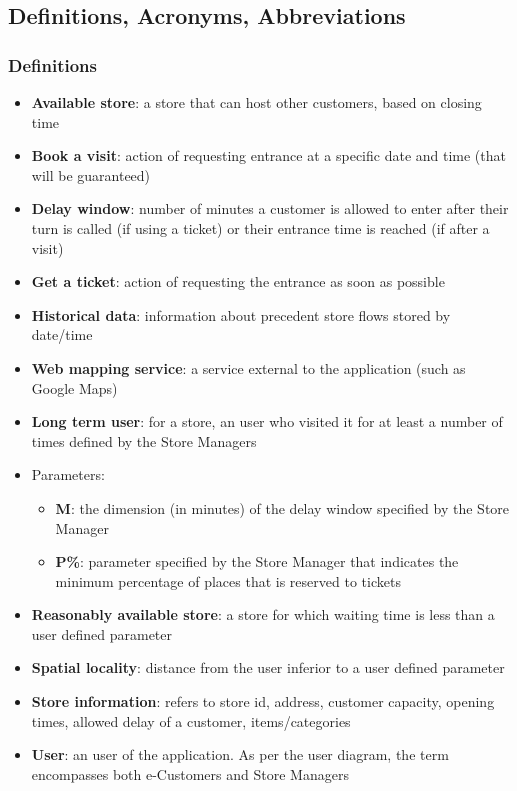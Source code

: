 \subsection{Definitions, Acronyms, Abbreviations}
\subsubsection{Definitions}
\begin{itemize}[itemsep=-1mm, topsep=-1mm]
	\item \textbf{Available store}: a store that can host other customers, based on closing time
	
	\item \textbf{Book a visit}: action of requesting entrance at a specific date and time (that will be guaranteed)
	
	\item \textbf{Delay window}: number of minutes a customer is allowed to enter after their turn is called (if using a ticket) or their entrance time is reached (if after a visit)
	
	\item \textbf{Get a ticket}: action of requesting the entrance as soon as possible
	
	\item \textbf{Historical data}: information about precedent store flows stored by date/time
	
	\item \textbf{Web mapping service}: a service external to the application (such as Google Maps)
	
	\item \textbf{Long term user}: for a store, an user who visited it for at least a number of times defined by the Store Managers
	
	\item Parameters:
	\begin{itemize}[itemsep=-1mm, topsep=-1mm]
		\item \textbf{M}: the dimension (in minutes) of the delay window specified by the Store Manager
		\item \textbf{P\%}: parameter specified by the Store Manager that indicates the minimum percentage of places that is reserved to tickets	
	\end{itemize}
	
	\item \textbf{Reasonably available store}: a store for which waiting time is less than a user defined parameter
	
	\item \textbf{Spatial locality}: distance from the user inferior to a user defined parameter 
	
	\item \textbf{Store information}: refers to store id, address, customer capacity, opening times, allowed delay of a customer, items/categories 
	
	\item \textbf{User}: an user of the application. As per the user diagram, the term encompasses both e-Customers and Store Managers	
\end{itemize}


